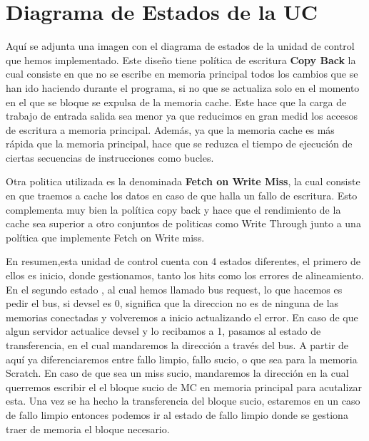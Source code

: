 \documentclass{article}
\begin{document}
\section{Diagrama de Estados de la UC}
Aquí se adjunta una imagen con el diagrama de estados de la unidad de control que hemos implementado. Este diseño tiene política de escritura \textbf{Copy Back} la cual consiste
en que no se escribe en memoria principal todos los cambios que se han ido haciendo durante el programa, si no que se actualiza solo en el momento en el que se bloque se expulsa
de la memoria cache. Este hace que la carga de trabajo de entrada salida sea menor ya que reducimos en gran medid los accesos de escritura a memoria principal. Además, ya que la 
memoria cache es más rápida que la memoria principal, hace que se reduzca el tiempo de ejecución de ciertas secuencias de instrucciones como bucles.\par
Otra politica utilizada es la denominada \textbf{Fetch on Write Miss}, la cual consiste en que traemos a cache los datos en caso de que halla un fallo de escritura. Esto complementa
muy bien la política copy back y hace que el rendimiento de la cache sea superior a otro conjuntos de politicas como Write Through junto a una política que implemente Fetch on Write miss.\cite{RivoireCacheWrite}\par
\par 
En resumen,esta unidad de control cuenta con 4 estados diferentes, el primero de ellos es inicio, donde gestionamos, tanto los hits como los errores de alineamiento. En el segundo estado
, al cual hemos llamado bus request, lo que hacemos es pedir el bus, si devsel es 0, significa que la direccion no es de ninguna de las memorias conectadas y volveremos a inicio actualizando el error. 
En caso de que algun servidor actualice devsel y lo recibamos a 1, pasamos al estado de transferencia, en el cual mandaremos la dirección a través del bus. 
A partir de aquí ya diferenciaremos entre fallo limpio, fallo sucio, o que sea para la memoria Scratch. En caso de que sea un miss sucio, mandaremos la dirección en la cual querremos escribir el el bloque sucio de MC en memoria principal
para acutalizar esta. Una vez se ha hecho la transferencia del bloque sucio, estaremos en un caso de fallo limpio entonces podemos ir al estado de fallo limpio donde se gestiona traer de memoria el bloque necesario.
\end{document}
